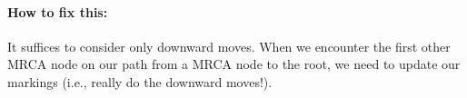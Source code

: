 \documentclass{llncs}
\begin{document}
\paragraph{How to fix this:}
It suffices to consider only downward moves. When we encounter the first other MRCA node on our path from a MRCA node to the root, we need to update our markings (i.e., really do the downward moves!).



\end{document}
